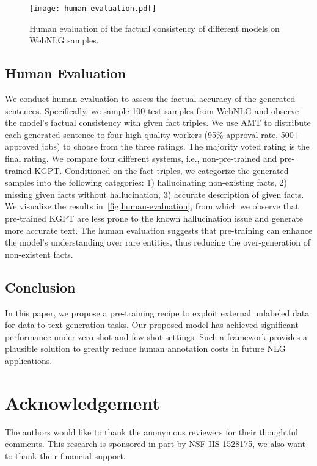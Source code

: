 \documentclass[11pt,a4paper]{article}
\newcommand{\model}{KGPT\xspace}
\begin{document}
\begin{figure}[!thb]
    \centering
    \texttt{[image: human-evaluation.pdf]}
    \caption{Human evaluation of the factual consistency of different models on WebNLG samples.}
    \label{fig:human-evaluation}
    \vspace{-1ex}
\end{figure}
\subsection{Human Evaluation}
We conduct human evaluation to assess the factual accuracy of the generated sentences. Specifically, we sample 100 test samples from WebNLG and observe the model's factual consistency with given fact triples.  We use AMT to distribute each generated sentence to four high-quality workers (95\% approval rate, 500+ approved jobs) to choose from the three ratings. The majority voted rating is the final rating. We compare four different systems, i.e., non-pre-trained and pre-trained \model. Conditioned on the fact triples, we categorize the generated samples into the following categories: 1) hallucinating non-existing facts, 2) missing given facts without hallucination, 3) accurate description of given facts. We visualize the results in~\autoref{fig:human-evaluation}, from which we observe that pre-trained \model are less prone to the known hallucination issue and generate more accurate text. The human evaluation suggests that pre-training can enhance the model's understanding over rare entities, thus reducing the over-generation of non-existent facts.



\subsection{Conclusion}
In this paper, we propose a pre-training recipe to exploit external unlabeled data for data-to-text generation tasks. Our proposed model has achieved significant performance under zero-shot and few-shot settings. Such a framework provides a plausible solution to greatly reduce human annotation costs in future NLG applications.

\section*{Acknowledgement}
The authors would like to thank the anonymous reviewers for their thoughtful comments. This research is sponsored in part by NSF IIS 1528175, we also want to thank their financial support.
\end{document}
